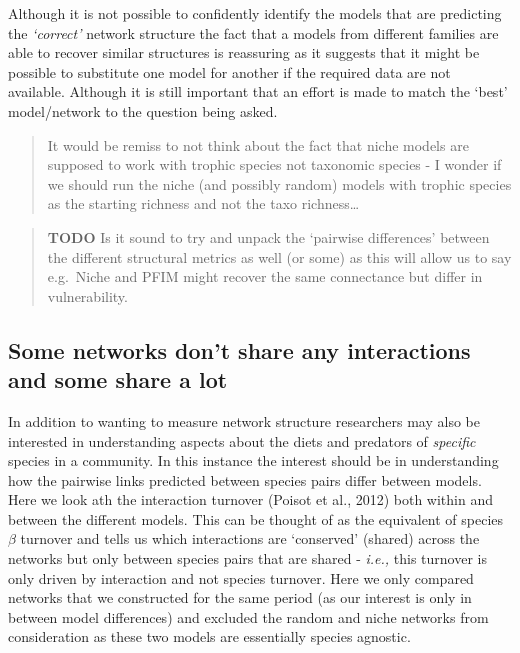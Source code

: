 \documentclass[
]{article}
\begin{document}
Although it is not possible to confidently identify the models that are
predicting the \emph{`correct'} network structure the fact that a models
from different families are able to recover similar structures is
reassuring as it suggests that it might be possible to substitute one
model for another if the required data are not available. Although it is
still important that an effort is made to match the `best' model/network
to the question being asked.

\begin{quote}
It would be remiss to not think about the fact that niche models are
supposed to work with trophic species not taxonomic species - I wonder
if we should run the niche (and possibly random) models with trophic
species as the starting richness and not the taxo richness\ldots{}
\end{quote}

\begin{quote}
\textbf{TODO} Is it sound to try and unpack the `pairwise differences'
between the different structural metrics as well (or some) as this will
allow us to say e.g.~Niche and PFIM might recover the same connectance
but differ in vulnerability.
\end{quote}

\subsection{Some networks don't share any interactions and some share a
lot}\label{some-networks-dont-share-any-interactions-and-some-share-a-lot}

In addition to wanting to measure network structure researchers may also
be interested in understanding aspects about the diets and predators of
\emph{specific} species in a community. In this instance the interest
should be in understanding how the pairwise links predicted between
species pairs differ between models. Here we look ath the interaction
turnover (Poisot et al., 2012) both within and between the different
models. This can be thought of as the equivalent of species \(\beta\)
turnover and tells us which interactions are `conserved' (shared) across
the networks but only between species pairs that are shared -
\emph{i.e.,} this turnover is only driven by interaction and not species
turnover. Here we only compared networks that we constructed for the
same period (as our interest is only in between model differences) and
excluded the random and niche networks from consideration as these two
models are essentially species agnostic.
\end{document}
